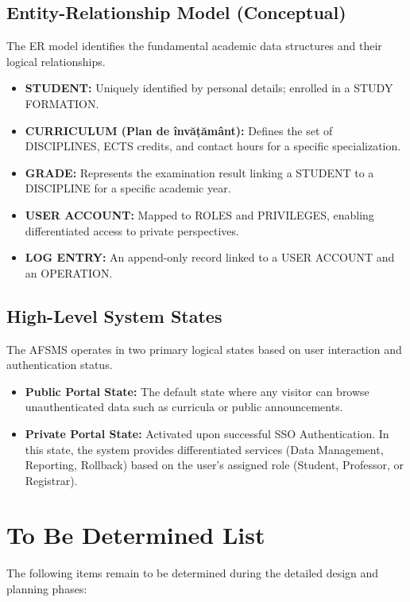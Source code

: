 \documentclass[11pt, a4paper]{article}
\begin{document}
\subsection{Entity-Relationship Model (Conceptual)}
The ER model identifies the fundamental academic data structures and their logical relationships.
\begin{itemize}
    \item \textbf{STUDENT:} Uniquely identified by personal details; enrolled in a STUDY FORMATION.
    \item \textbf{CURRICULUM (Plan de învățământ):} Defines the set of DISCIPLINES, ECTS credits, and contact hours for a specific specialization.
    \item \textbf{GRADE:} Represents the examination result linking a STUDENT to a DISCIPLINE for a specific academic year.
    \item \textbf{USER ACCOUNT:} Mapped to ROLES and PRIVILEGES, enabling differentiated access to private perspectives.
    \item \textbf{LOG ENTRY:} An append-only record linked to a USER ACCOUNT and an OPERATION.
\end{itemize}

\subsection{High-Level System States}
The AFSMS operates in two primary logical states based on user interaction and authentication status.
\begin{itemize}
    \item \textbf{Public Portal State:} The default state where any visitor can browse unauthenticated data such as curricula or public announcements.
    \item \textbf{Private Portal State:} Activated upon successful SSO Authentication. In this state, the system provides differentiated services (Data Management, Reporting, Rollback) based on the user's assigned role (Student, Professor, or Registrar).
\end{itemize}

\section{To Be Determined List}

The following items remain to be determined during the detailed design and planning phases:
\end{document}

